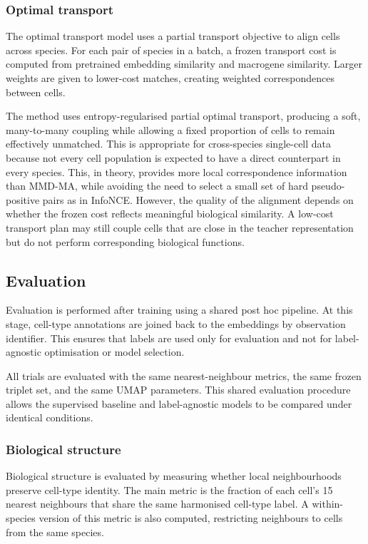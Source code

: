 \documentclass{article}
\begin{document}
\subsubsection{Optimal transport}
The optimal transport model uses a partial transport objective to align cells across species. For each pair of species in a batch, a frozen transport cost is computed from pretrained embedding similarity and macrogene similarity. Larger weights are given to lower-cost matches, creating weighted correspondences between cells.

The method uses entropy-regularised partial optimal transport, producing a soft, many-to-many coupling while allowing a fixed proportion of cells to remain effectively unmatched. This is appropriate for cross-species single-cell data because not every cell population is expected to have a direct counterpart in every species. This, in theory, provides more local correspondence information than MMD-MA, while avoiding the need to select a small set of hard pseudo-positive pairs as in InfoNCE. However, the quality of the alignment depends on whether the frozen cost reflects meaningful biological similarity. A low-cost transport plan may still couple cells that are close in the teacher representation but do not perform corresponding biological functions.

\subsection{Evaluation}
Evaluation is performed after training using a shared post hoc pipeline. At this stage, cell-type annotations are joined back to the embeddings by observation identifier. This ensures that labels are used only for evaluation and not for label-agnostic optimisation or model selection.

All trials are evaluated with the same nearest-neighbour metrics, the same frozen triplet set, and the same UMAP parameters. This shared evaluation procedure allows the supervised baseline and label-agnostic models to be compared under identical conditions.
\subsubsection{Biological structure}
Biological structure is evaluated by measuring whether local neighbourhoods preserve cell-type identity. The main metric is the fraction of each cell’s 15 nearest neighbours that share the same harmonised cell-type label. A within-species version of this metric is also computed, restricting neighbours to cells from the same species.
\end{document}
